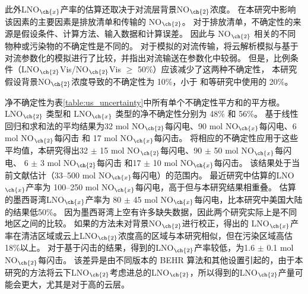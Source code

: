此外LNO$_{\ch{x}}$产率的估算还取决于对流层背景NO$_{\ch{2}}$浓度。
在本研究中影响该因素的主要因素是排放清单和传输的 NO$_{\ch{2}}$。
对于排放清单，不确定性的来源是假设条件、计算方法、输入数据和计算误差。
因此与 NO$_{\ch{2}}$ 相关的不同物种或污染物的不确定性是不同的。
对于模拟的对流传输，\citet{Li.2018}将云解析模拟与基于对流参数化的模拟进行了比较，并指出对流输送在参数化中较弱。
但是，比例条件（LNO$_{\ch{2}}$Vis/NO$_{\ch{2}}$Vis $\geq$ 50\%）应该减少了这两种不确定性，
本研究假设背景NO$_{\ch{2}}$浓度导致的不确定性为 10\%，小于 \citet{Allen.2019}和\citet{Bucsela.2019}等研究中使用的 20\%。

净不确定性为表\ref{table:us_uncertainty}中所有单个不确定性平方和的平方根。
LNO$_{\ch{2}}$ 类型和 LNO$_{\ch{x}}$ 类型的净不确定性分别为 48\% 和 56\%。
基于线性回归和求和法的平均结果为32 mol NO$_{\ch{2}}$每闪电、90 mol NO$_{\ch{x}}$每闪电、6 mol NO$_{\ch{2}}$每闪击 和 17 mol NO$_{\ch{x}}$每闪击。
将相应的不确定性应用于这些平均值，本研究得出32 $\pm$ 15 mol NO$_{\ch{2}}$每闪电、90 $\pm$ 50 mol NO$_{\ch{x}}$每闪电、
6 $\pm$ 3 mol NO$_{\ch{2}}$每闪击 和17 $\pm$ 10 mol NO$_{\ch{x}}$每闪击。
该结果处于当前文献估计（33--500 mol NO$_{\ch{x}}$每闪电）的范围内\citep{Schumann.2007,Beirle.2010,Bucsela.2010}。
最近\citet{Bucsela.2010}研究中估算的LNO$_{\ch{x}}$产率为 100--250 mol NO$_{\ch{x}}$每闪电，高于但与本研究结果相重叠。
\citet{Pickering.2016}估算的墨西哥湾LNO$_{\ch{x}}$产率为 80 $\pm$ 45 mol NO$_{\ch{x}}$每闪电，比本研究中美国大陆的结果低50\%。
因为墨西哥湾上空有许多缺失数据，因此两个研究实际上是不同地区之间的比较。
如果\citet{Pickering.2016}的方法未对背景NO$_{\ch{2}}$进行校正，得出的 LNO$_{\ch{x}}$产率在清洁区域或云上LNO$_{\ch{2}}$浓度高的区域与本研究相似，但在污染区域高估18\%以上。
对于基于闪击的结果，\citet{Lapierre.2020}得到的LNO$_{\ch{2}}$产率较低，为1.6 $\pm$ 0.1 mol NO$_{\ch{2}}$每闪击。
该差异是由不同版本的 BEHR 算法和其他设置引起的，由于本研究的方法将云下LNO$_{\ch{2}}$考虑进总的LNO$_{\ch{2}}$，所以得到的LNO$_{\ch{2}}$产量可能会更大，尤其是对于高的云层。

